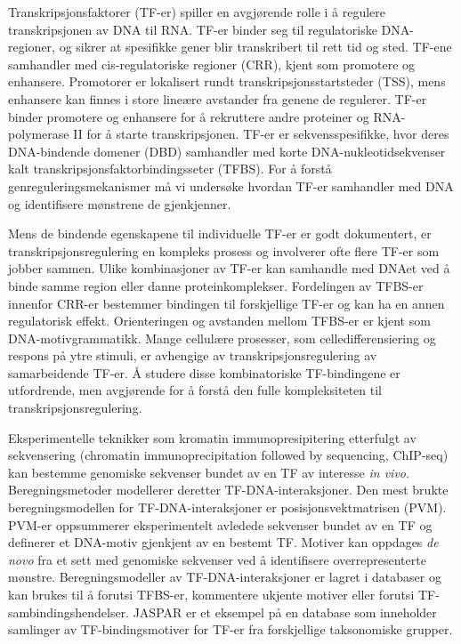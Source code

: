 \begin{xabstract}[Sammendrag]

    Transkripsjonsfaktorer (TF-er) spiller en avgjørende rolle i å regulere transkripsjonen av DNA til RNA. TF-er binder seg til regulatoriske DNA-regioner, og sikrer at spesifikke gener blir transkribert til rett tid og sted. TF-ene samhandler med cis-regulatoriske regioner (CRR), kjent som promotere og enhansere. Promotorer er lokalisert rundt transkripsjonsstartsteder (TSS), mens enhansere kan finnes i store lineære avstander fra genene de regulerer. TF-er binder promotere og enhansere for å rekruttere andre proteiner og RNA-polymerase II for å starte transkripsjonen. TF-er er sekvensspesifikke, hvor deres DNA-bindende domener (DBD) samhandler med korte DNA-nukleotidsekvenser kalt transkripsjonsfaktorbindingsseter (TFBS). For å forstå genreguleringsmekanismer må vi undersøke hvordan TF-er samhandler med DNA og identifisere mønstrene de gjenkjenner.

    Mens de bindende egenskapene til individuelle TF-er er godt dokumentert, er transkripsjonsregulering en kompleks prosess og involverer ofte flere TF-er som jobber sammen. Ulike kombinasjoner av TF-er kan samhandle med DNAet ved å binde samme region eller danne proteinkomplekser. Fordelingen av TFBS-er innenfor CRR-er bestemmer bindingen til forskjellige TF-er og kan ha en annen regulatorisk effekt. Orienteringen og avstanden mellom TFBS-er er kjent som DNA-motivgrammatikk. Mange cellulære prosesser, som celledifferensiering og respons på ytre stimuli, er avhengige av transkripsjonsregulering av samarbeidende TF-er. Å studere disse kombinatoriske TF-bindingene er utfordrende, men avgjørende for å forstå den fulle kompleksiteten til transkripsjonsregulering.

    Eksperimentelle teknikker som kromatin immunopresipitering etterfulgt av sekvensering (chromatin immunoprecipitation followed by sequencing, ChIP-seq) kan bestemme genomiske sekvenser bundet av en TF av interesse \textit{in vivo}. Beregningsmetoder modellerer deretter TF-DNA-interaksjoner. Den mest brukte beregningsmodellen for TF-DNA-interaksjoner er posisjonsvektmatrisen (PVM). PVM-er oppsummerer eksperimentelt avledede sekvenser bundet av en TF og definerer et DNA-motiv gjenkjent av en bestemt TF. Motiver kan oppdages \textit{de novo} fra et sett med genomiske sekvenser ved å identifisere overrepresenterte mønstre. Beregningsmodeller av TF-DNA-interaksjoner er lagret i databaser og kan brukes til å forutsi TFBS-er, kommentere ukjente motiver eller forutsi TF-sambindingshendelser. JASPAR er et eksempel på en database som inneholder samlinger av TF-bindingsmotiver for TF-er fra forskjellige taksonomiske grupper.


\end{xabstract}
